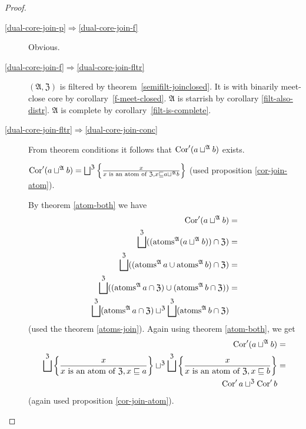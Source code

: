 \begin{proof}
~
\begin{description}
\item [{\ref{dual-core-join-p}$\Rightarrow$\ref{dual-core-join-f}}] Obvious.
\item [{\ref{dual-core-join-f}$\Rightarrow$\ref{dual-core-join-fltr}}] $(\mathfrak{A},\mathfrak{Z})$
is filtered by theorem~\ref{semifilt-joinclosed}. It is with binarily
meet-close core by corollary~\ref{f-meet-closed}. $\mathfrak{A}$ is starrish
by corollary \ref{filt-also-distr}. $\mathfrak{A}$ is complete by
corollary~\ref{filt-is-complete}.
\item [{\ref{dual-core-join-fltr}$\Rightarrow$\ref{dual-core-join-conc}}] From
theorem conditions it follows that $\operatorname{Cor}'(a\sqcup^{\mathfrak{A}}b)$
exists.


$\Cor'(a\sqcup^{\mathfrak{A}}b)=\bigsqcup^{\mathfrak{Z}}\setcond x{x\text{ is an atom of }\mathfrak{Z},x\sqsubseteq a\sqcup^{\mathfrak{A}}b}$
(used proposition \ref{cor-join-atom}).


By theorem \ref{atom-both} we have
\begin{align*}
\Cor'(a\sqcup^{\mathfrak{A}}b) & =\\
\bigsqcup^{\mathfrak{Z}}((\atoms^{\mathfrak{A}}(a\sqcup^{\mathfrak{A}}b))\cap\mathfrak{Z}) & =\\
\bigsqcup^{\mathfrak{Z}}((\atoms^{\mathfrak{A}}a\cup\atoms^{\mathfrak{A}}b)\cap\mathfrak{Z}) & =\\
\bigsqcup^{\mathfrak{Z}}((\atoms^{\mathfrak{A}}a\cap\mathfrak{Z})\cup(\atoms^{\mathfrak{A}}b\cap\mathfrak{Z})) & =\\
\bigsqcup^{\mathfrak{Z}}(\atoms^{\mathfrak{A}}a\cap\mathfrak{Z})\sqcup^{\mathfrak{Z}}\bigsqcup^{\mathfrak{Z}}(\atoms^{\mathfrak{A}}b\cap\mathfrak{Z})
\end{align*}
(used the theorem \ref{atoms-join}). Again using theorem \ref{atom-both},
we get
\begin{align*}
\Cor'(a\sqcup^{\mathfrak{A}}b) & =\\
\bigsqcup^{\mathfrak{Z}}\setcond x{x\text{ is an atom of }\mathfrak{Z},x\sqsubseteq a}\sqcup^{\mathfrak{Z}}\bigsqcup^{\mathfrak{Z}}\setcond x{x\text{ is an atom of }\mathfrak{Z},x\sqsubseteq b} & =\\
\Cor'a\sqcup^{\mathfrak{Z}}\Cor'b
\end{align*}
(again used proposition \ref{cor-join-atom}).

\end{description}
\end{proof}

